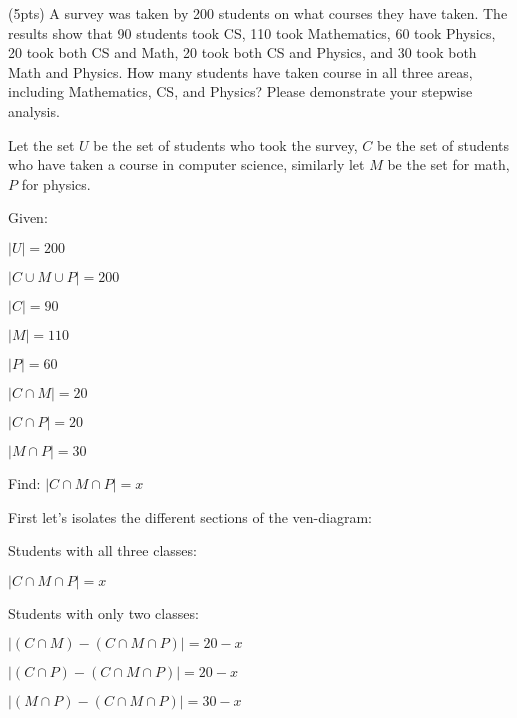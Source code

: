 \documentclass{article}
\newenvironment{Problem}
{\noindent\color{black}}
{\newline}
\newenvironment{Solution}
{\noindent\color{red}}
{\newline}
\begin{document}
\begin{Problem}
    (5pts) A survey was taken by 200 students on what courses they have taken. The
    results show that 90 students took CS, 110 took Mathematics, 60 took
    Physics, 20 took both CS and Math, 20 took both CS and Physics, and 30 took
    both Math and Physics. How many students have taken course in all three
    areas, including Mathematics, CS, and Physics? Please demonstrate your
    stepwise analysis.
\end{Problem}


\begin{Solution}
    Let the set $U$ be the set of students who took the survey, $C$ be the set of students who have taken a course in computer science,
    similarly let $M$ be the set for math,  $P$ for physics. 

    \phantom{ }

    Given: 
    \begin{adjustwidth}{2em}{0em} 
        $|U| = 200$

        $|C \cup M \cup P| = 200$ 

        $|C| = 90$

        $|M| = 110$

        $|P| = 60$

        $|C \cap M| = 20$

        $|C \cap P| = 20$
        
        $|M \cap P| = 30$ 
    \end{adjustwidth}

    \phantom{ }

    Find: $|C \cap M \cap P| = x$

    \phantom{ }

    First let's isolates the different sections of the ven-diagram:

    \begin{adjustwidth}{2em}{0em}
        Students with all three classes:
        \begin{adjustwidth}{2em}{0em}
            $|C \cap M \cap P| = x$
        \end{adjustwidth}

        Students with only two classes:

        \begin{adjustwidth}{2em}{0em}
            $|(C \cap M) - (C \cap M \cap P)| = 20 - x$

            $|(C \cap P) - (C \cap M \cap P)| = 20 - x$

            $|(M \cap P)- (C \cap M \cap P)| = 30 - x$ 
        \end{adjustwidth}


\end{adjustwidth}
\end{Solution}
\end{document}
